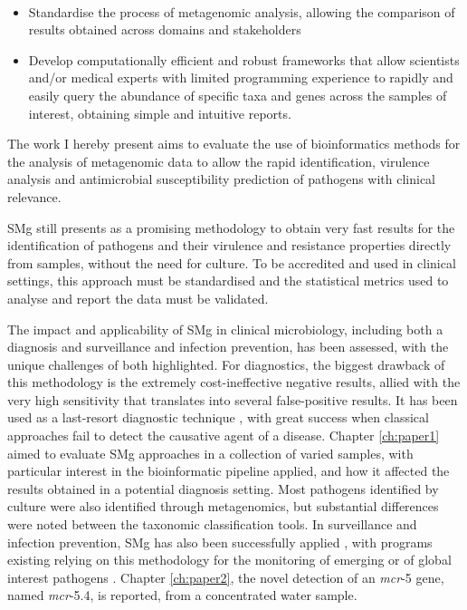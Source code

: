 \mbox{}\\
\vspace{8cm}

\begin{itemize}
    \item Standardise the process of metagenomic analysis, allowing the comparison of results obtained across domains and stakeholders
    \item Develop computationally efficient and robust frameworks that allow scientists and/or medical experts with limited programming experience to rapidly and easily query the abundance of specific taxa and genes across the samples of interest, obtaining simple and intuitive reports. 
\end{itemize}

The work I hereby present aims to evaluate the use of bioinformatics methods for the analysis of metagenomic data to allow the rapid identification, virulence analysis and antimicrobial susceptibility prediction of pathogens with clinical relevance. 

\ac{SMg} still presents as a promising methodology to obtain very fast results for the identification of pathogens and their virulence and resistance properties directly from samples, without the need for culture. 
To be accredited and used in clinical settings, this approach must be standardised and the statistical metrics used to analyse and report the data must be validated.

The impact and applicability of \ac{SMg} in clinical microbiology, including both a diagnosis and surveillance and infection prevention, has been assessed, with the unique challenges of both highlighted. For diagnostics, the biggest drawback of this methodology is the extremely cost-ineffective negative results, allied with the very high sensitivity that translates into several false-positive results. It has been used as a last-resort diagnostic technique \citep{he_case_2022, vijayvargiya_application_2019, sanabria_shotgun-metagenomics_2020, hirakata_application_2021}, with great success when classical approaches fail to detect the causative agent of a disease. Chapter \ref{ch:paper1} aimed to evaluate \ac{SMg} approaches in a collection of varied samples, with particular interest in the bioinformatic pipeline applied, and how it affected the results obtained in a potential diagnosis setting. Most pathogens identified by culture were also identified through metagenomics, but substantial differences were noted between the taxonomic classification tools. In surveillance and infection prevention, \ac{SMg} has also been successfully applied \citep{loman_culture-independent_2013, huang_metagenomics_2017, li_microbiome_2021}, with programs existing relying on this methodology for the monitoring of emerging or of global interest pathogens \citep{ko_metagenomics-enabled_2022}. Chapter \ref{ch:paper2}, the novel detection of an \textit{mcr}-5 gene, named \textit{mcr}-5.4, is reported, from a concentrated water sample. 

